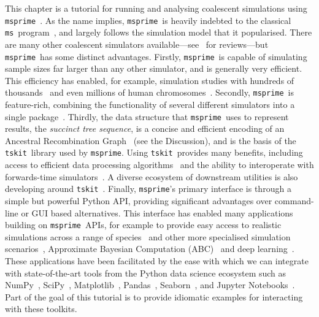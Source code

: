 \documentclass[graybox]{svmult}
\newcommand{\msprime}[0]{\texttt{msprime}}
\newcommand{\tskit}[0]{\texttt{tskit}}
\newcommand{\ms}[0]{\texttt{ms}}
\begin{document}
This chapter is a tutorial for running and analysing coalescent simulations
using \msprime~\citep{kelleher2016efficient,baumdicker2022efficient}.
As the name implies, \msprime\ is heavily indebted to the classical
\ms\ program~\citep{hudson2002generating}, and largely follows the
simulation model that it popularised.
There are many other coalescent simulators available---see~\citep{carvajal2008simulation,liu2008survey,arenas2012simulation,
yuan2012overview,hoban2012computer} for reviews---but \msprime\ has
some distinct advantages.
Firstly, \msprime\ is capable of simulating
sample sizes far larger than any other simulator, and is generally
very efficient. This efficiency has enabled, for example,
simulation
studies with hundreds of
thousands~\citep{martin2017human,martin2020correction,ragsdale2020lessons}
and even millions of human chromosomes~\citep{andersontrocme2023genes}.
Secondly, \msprime\ is feature-rich, combining the functionality of
several different simulators into a single
package~\citep{baumdicker2022efficient}.
Thirdly, the data structure that \msprime\ uses
to represent results,
the \emph{succinct tree sequence},
is a concise and efficient encoding of
an Ancestral Recombination Graph~\citep{wong2024general}
(see the Discussion),
and is the basis of the \tskit\ library used by \msprime.
Using \tskit\ provides many benefits, including access to efficient
data processing algorithms~\citep{ralph2020efficiently,lehmann2025on}
and the ability to interoperate with forwards-time
simulators~\citep{kelleher2018efficient,haller2018tree}.
A diverse ecosystem of downstream utilities is also developing around
\tskit~\cite{fan2022genealogical,nowbandegani2023extremely,tsambos2023link,
tagami2024tstrait,fritze2024forest}.
Finally, \msprime's primary interface is through a simple but powerful Python
API, providing significant advantages over command-line or GUI based alternatives.
This interface has enabled many applications building
on \msprime\ APIs, for example to provide easy access to
realistic simulations across a range of
species~\citep{adrion2020stdpopsim,lauterbur2023expanding,gower2025accessible}
and other more specialised simulation
scenarios~\citep{mckenzie2020ipcoal,rivera2021simulation,petrslendr2023, laetsch2023gimble},
Approximate Bayesian Computation (ABC)~\citep{huang2025estimating}
and deep learning~\cite{korfmann2023deep}.
These applications have been facilitated by the ease with
which we can integrate with state-of-the-art tools from the
Python data science ecosystem such as NumPy~\citep{walt2011numpy},
SciPy~\citep{jones-2018-scipy},
Matplotlib~\citep{hunter2007matplotlib}, Pandas~\citep{mckinney2010data},
Seaborn~\citep{michael_waskom_2017_883859}, and
Jupyter Notebooks~\citep{perez2007ipython}. Part of the goal
of this tutorial is to provide idiomatic examples for interacting
with these toolkits.
\end{document}
